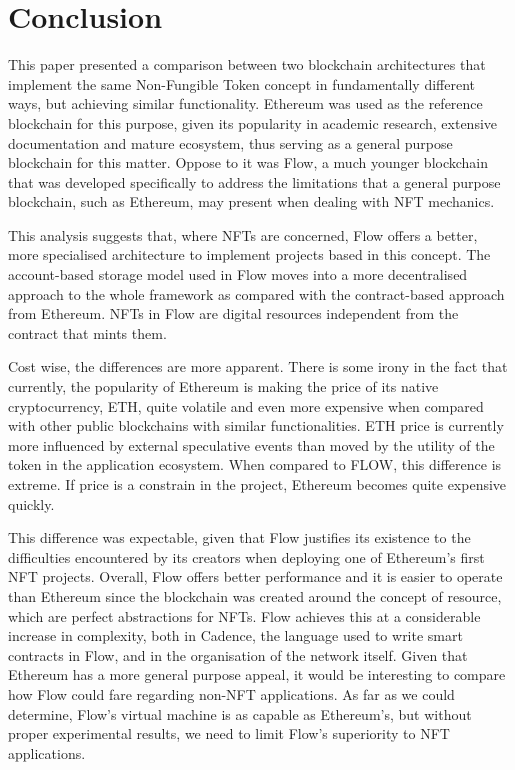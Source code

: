 \documentclass[../main.tex]{subfiles}
\begin{document}
\section{Conclusion}
\label{sec:conclusion}
This paper presented a comparison between two blockchain architectures that implement the same Non-Fungible Token concept in fundamentally different ways, but achieving similar functionality. Ethereum was used as the reference blockchain for this purpose, given its popularity in academic research, extensive documentation and mature ecosystem, thus serving as a general purpose blockchain for this matter. Oppose to it was Flow, a much younger blockchain that was developed specifically to address the limitations that a general purpose blockchain, such as Ethereum, may present when dealing with NFT mechanics.
\par
This analysis suggests that, where NFTs are concerned, Flow offers a better, more specialised architecture to implement projects based in this concept. The account-based storage model used in Flow moves into a more decentralised approach to the whole framework as compared with the contract-based approach from Ethereum. NFTs in Flow are digital resources independent from the contract that mints them.
\par
Cost wise, the differences are more apparent. There is some irony in the fact that currently, the popularity of Ethereum is making the price of its native cryptocurrency, ETH, quite volatile and even more expensive when compared with other public blockchains with similar functionalities. ETH price is currently more influenced by external speculative events than moved by the utility of the token in the application ecosystem. When compared to FLOW, this difference is extreme. If price is a constrain in the project, Ethereum becomes quite expensive quickly.
\par
This difference was expectable, given that Flow justifies its existence to the difficulties encountered by its creators when deploying one of Ethereum's first NFT projects. Overall, Flow offers better performance and it is easier to operate than Ethereum since the blockchain was created around the concept of resource, which are perfect abstractions for NFTs. Flow achieves this at a considerable increase in complexity, both in Cadence, the language used to write smart contracts in Flow, and in the organisation of the network itself. Given that Ethereum has a more general purpose appeal, it would be interesting to compare how Flow could fare regarding non-NFT applications. As far as we could determine, Flow's virtual machine is as capable as Ethereum's,  but without proper experimental results, we need to limit Flow's superiority to NFT applications.
\end{document}
